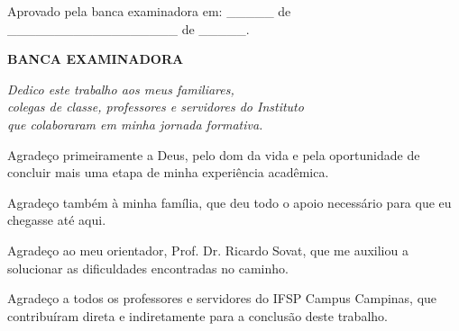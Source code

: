 \documentclass[
	12pt,				%
	openright,			%
	oneside,			%
	a4paper,			%
	chapter=TITLE,		%
	english,			%
	brazil				%
	]{abntex2}
\renewcommand{\ABNTEXchapterfont}{\bfseries\rmfamily}
\begin{document}
\begin{folhadeaprovacao}
  \begin{center}
    {\ABNTEXchapterfont\large\imprimirautor}
    \vspace*{\fill}\vspace*{\fill}
    \begin{center}
      \ABNTEXchapterfont\bfseries\Large\imprimirtitulo
    \end{center}
    \vspace*{\fill}
    \hspace{.45\textwidth}
    \begin{minipage}{.5\textwidth}
        \imprimirpreambulo
    \end{minipage}%
    \vspace*{\fill}
  \end{center}
  
  Aprovado pela banca examinadora em: \_\_\_\_\_ de \_\_\_\_\_\_\_\_\_\_\_\_\_\_\_\_\_\_ de \_\_\_\_\_.
  
  \begin{center}
    \bfseries BANCA EXAMINADORA
  \end{center}
  
  
\end{folhadeaprovacao}

\begin{dedicatoria}
   \vspace*{\fill}
   \centering
   \noindent
   \textit{Dedico este trabalho aos meus familiares,\\
   colegas de classe, professores e servidores do Instituto\\
   que colaboraram em minha jornada formativa.}
   \vspace*{\fill}
\end{dedicatoria}

\begin{agradecimentos}
Agradeço primeiramente a Deus, pelo dom da vida e pela oportunidade de concluir mais uma etapa de minha experiência acadêmica.

Agradeço também à minha família, que deu todo o apoio necessário para que eu chegasse até aqui.

Agradeço ao meu orientador, Prof. Dr. Ricardo Sovat, que me auxiliou a solucionar as dificuldades encontradas no caminho.

Agradeço a todos os professores e servidores do IFSP Campus Campinas, que contribuíram direta e indiretamente para a conclusão deste trabalho.
\end{agradecimentos}
\end{document}

